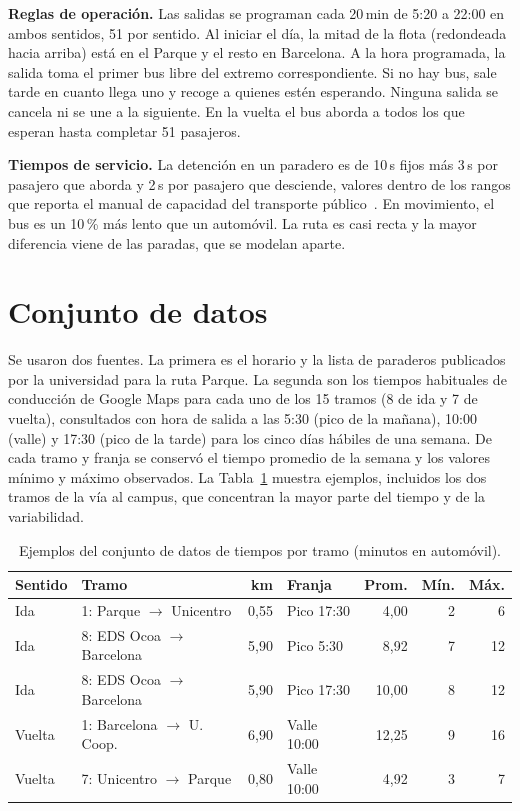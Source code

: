 \documentclass[runningheads]{llncs}
\begin{document}
\textbf{Reglas de operación.} Las salidas se programan cada 20\,min de 5:20 a 22:00 en ambos sentidos, 51 por sentido. Al iniciar el día, la mitad de la flota (redondeada hacia arriba) está en el Parque y el resto en Barcelona. A la hora programada, la salida toma el primer bus libre del extremo correspondiente. Si no hay bus, sale tarde en cuanto llega uno y recoge a quienes estén esperando. Ninguna salida se cancela ni se une a la siguiente. En la vuelta el bus aborda a todos los que esperan hasta completar 51 pasajeros.

\textbf{Tiempos de servicio.} La detención en un paradero es de 10\,s fijos más 3\,s por pasajero que aborda y 2\,s por pasajero que desciende, valores dentro de los rangos que reporta el manual de capacidad del transporte público~\cite{tcqsm2013}. En movimiento, el bus es un 10\,\% más lento que un automóvil. La ruta es casi recta y la mayor diferencia viene de las paradas, que se modelan aparte.

\section{Conjunto de datos}

Se usaron dos fuentes. La primera es el horario y la lista de paraderos publicados por la universidad para la ruta Parque. La segunda son los tiempos habituales de conducción de Google Maps para cada uno de los 15 tramos (8 de ida y 7 de vuelta), consultados con hora de salida a las 5:30 (pico de la mañana), 10:00 (valle) y 17:30 (pico de la tarde) para los cinco días hábiles de una semana. De cada tramo y franja se conservó el tiempo promedio de la semana y los valores mínimo y máximo observados. La Tabla~\ref{tab:datos} muestra ejemplos, incluidos los dos tramos de la vía al campus, que concentran la mayor parte del tiempo y de la variabilidad.

\begin{table}[t]
\centering
\caption{Ejemplos del conjunto de datos de tiempos por tramo (minutos en automóvil).}
\label{tab:datos}
\setlength{\tabcolsep}{4pt}
\begin{tabular}{llrlrrr}
\toprule
Sentido & Tramo & km & Franja & Prom. & Mín. & Máx.\\
\midrule
Ida & 1: Parque $\to$ Unicentro & 0,55 & Pico 17:30 & 4,00 & 2 & 6\\
Ida & 8: EDS Ocoa $\to$ Barcelona & 5,90 & Pico 5:30 & 8,92 & 7 & 12\\
Ida & 8: EDS Ocoa $\to$ Barcelona & 5,90 & Pico 17:30 & 10,00 & 8 & 12\\
Vuelta & 1: Barcelona $\to$ U. Coop. & 6,90 & Valle 10:00 & 12,25 & 9 & 16\\
Vuelta & 7: Unicentro $\to$ Parque & 0,80 & Valle 10:00 & 4,92 & 3 & 7\\
\bottomrule
\end{tabular}
\end{table}
\end{document}
